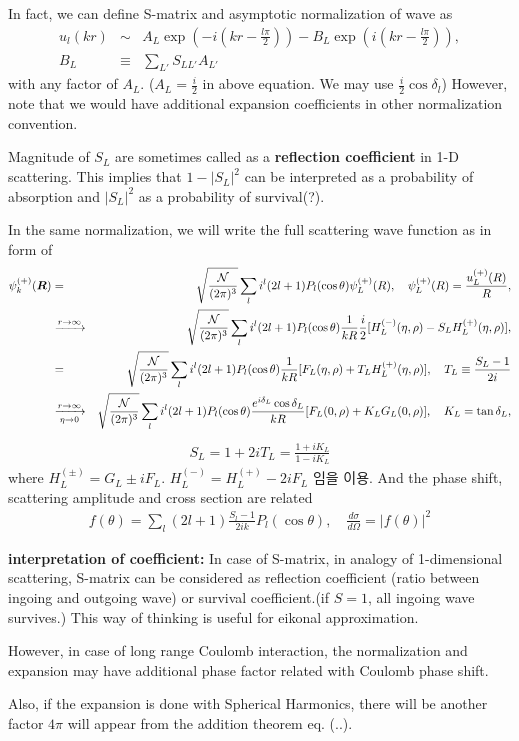 \documentclass[10pt]{book}
\def\bm{\boldsymbol}
\newcommand{\bea}{\begin{eqnarray}}
\newcommand{\eea}{\end{eqnarray}}
\newcommand{\no}{\nonumber \\}
\def\vR{{\bm R}}
\begin{document}
\begin{itemize}
In fact, we can define S-matrix and asymptotic normalization of wave as
\bea 
u_{l}(kr)&\sim &A_L \exp(-i(kr-\frac{l\pi}{2}))
           -B_L \exp(i(kr-\frac{l\pi}{2})),\no
B_L&\equiv &\sum_{L'}S_{LL'}A_{L'}             
\eea 
with any factor of $A_L$. ($A_L=\frac{i}{2}$ in above equation. 
We may use $\frac{i}{2}\cos\delta_l $) However, note that 
we would have additional expansion coefficients in other normalization convention. 

Magnitude of $S_L$ are sometimes called as a {\bf reflection coefficient} in
1-D scattering. This implies that $1-|S_L|^2$ can be interpreted as a probability of absorption
and $|S_L|^2$ as a probability of survival(?). 
      
In the same normalization, we will write 
the full scattering wave function as in form of 
\bea
\psi_k^{(+)}(\vR)
&=& \sqrt{\frac{\cal N}{(2\pi)^3}}
    \sum_{l} i^l(2l+1) P_{l}(\cos\theta) \psi^{(+)}_L(R),
    \quad \psi_L^{(+)}(R)=\frac{u^{(+)}_L(R)}{R},\no 
&\xrightarrow{r\to \infty}&\sqrt{\frac{\cal N}{(2\pi)^3}}\sum_{l}
  i^l(2l+1) P_{l}(\cos\theta)\frac{1}{kR} \frac{i}{2}
  [H_L^{(-)}(\eta,\rho)-S_L H^{(+)}_L(\eta,\rho)] ,\no 
&=&\sqrt{\frac{\cal N}{(2\pi)^3}}\sum_{l}
  i^l(2l+1) P_{l}(\cos\theta)\frac{1}{kR} 
  [F_L(\eta,\rho)+ T_L H^{(+)}_L(\eta,\rho)],\quad  T_L\equiv \frac{S_L-1}{2i}\no  
&\xrightarrow[\eta\to 0]{r\to \infty}&\sqrt{\frac{\cal N}{(2\pi)^3}}\sum_{l}
  i^l(2l+1) P_{l}(\cos\theta) \frac{e^{i\delta_L}\cos\delta_L}{kR}
  [F_L(0,\rho)+K_L G_L(0,\rho)],\quad K_L=\tan\delta_L ,  \no 
\eea
\bea 
S_L=1+2i T_L=\frac{1+i K_L}{1-i K_L}
\eea 
where $H_L^{(\pm)}=G_L\pm i F_L$. 
$H_L^{(-)}=H_L^{(+)}-2i F_L$ 임을 이용.
And the phase shift, scattering amplitude and cross section are related 
\bea 
f(\theta)=\sum_l (2l+1) \frac{S_l-1}{2i k} P_l(\cos\theta),\quad \frac{d\sigma}{d\Omega}=|f(\theta)|^2
\eea 

{\bf interpretation of coefficient:} In case of S-matrix, in analogy of 1-dimensional 
scattering, S-matrix can be considered as reflection coefficient (ratio between 
ingoing and outgoing wave) or survival coefficient.(if $S=1$, all ingoing wave survives.)
This way of thinking is useful for eikonal approximation.    


However, in case of long range Coulomb interaction, the normalization and 
expansion may have additional phase factor related with Coulomb phase shift. 

Also, if the expansion is done with Spherical Harmonics, 
there will be another factor $4\pi$  will appear from
the addition theorem eq. (..).


\end{itemize}
\end{document}
